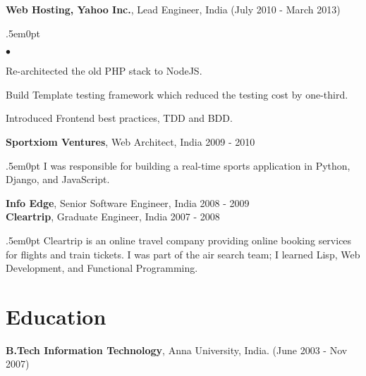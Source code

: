 \documentclass[margin, line, 10pt]{res}
\newenvironment{list2}{
  \begin{list}{$\bullet$}{%
      \setlength{\itemsep}{0in}
      \setlength{\parsep}{0in} \setlength{\parskip}{0in}
      \setlength{\topsep}{0in} \setlength{\partopsep}{0in}
      \setlength{\leftmargin}{0.2in}}}{\end{list}}
\begin{document}
\begin{resume}
{\Large {\bf Web Hosting, Yahoo Inc.}}, Lead Engineer, India  \hfill (July 2010 - March 2013)\\
\begin{adjustwidth}{.5em}{0pt}
\begin{list2}
\vspace{-.2cm}
\item Re-architected the old PHP stack to NodeJS.\\
\vspace{-.3cm}
\item Build Template testing framework which reduced the testing cost by one-third.\\
\vspace{-.3cm}
\item Introduced Frontend best practices, TDD and BDD.\\
\end{list2}
\vspace{.05cm}
\end{adjustwidth}

{\Large {\bf Sportxiom Ventures}}, Web Architect, India  \hfill 2009 - 2010\\
\vspace{-.3cm}
\begin{adjustwidth}{.5em}{0pt}
I was responsible for building a real-time sports application in Python, Django,
and JavaScript.
\end{adjustwidth}
\vspace{.05cm}

{\Large {\bf Info Edge}}, Senior Software Engineer, India \hfill 2008 - 2009 \\

{\Large {\bf Cleartrip}}, Graduate Engineer, India \hfill 2007 - 2008\\
\vspace{-.3cm}
\begin{adjustwidth}{.5em}{0pt}
  Cleartrip is an online travel company providing online booking services for flights and train tickets. I was part of the air search team; I learned Lisp, Web Development, and Functional Programming.
\end{adjustwidth}
\vspace{.05cm}

\section{Education}
{\bf B.Tech Information Technology}, Anna University, India. \hfill (June 2003 - Nov 2007)


\end{resume}
\end{document}
